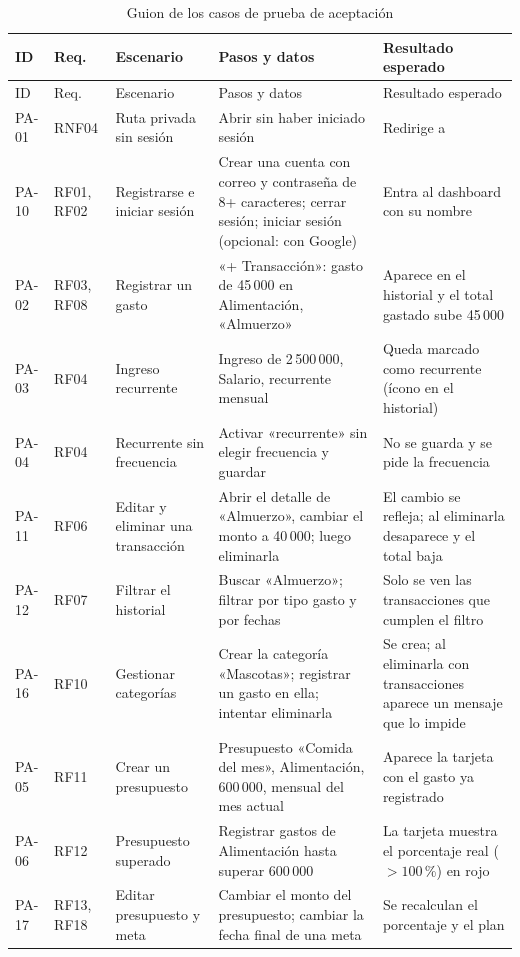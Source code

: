 {\footnotesize\renewcommand{\arraystretch}{1.15}
\begin{longtable}{L{1.1cm} L{1.3cm} L{3.2cm} L{4.6cm} L{3.2cm}}
\caption{Guion de los casos de prueba de aceptación}\label{tab:pa}\\
\toprule
ID & Req. & Escenario & Pasos y datos & Resultado esperado \\
\midrule
\endfirsthead
\toprule
ID & Req. & Escenario & Pasos y datos & Resultado esperado \\
\midrule
\endhead
\bottomrule
\endfoot
PA-01 & RNF04 & Ruta privada sin sesión & Abrir  sin haber iniciado sesión & Redirige a  \\
PA-10 & RF01, RF02 & Registrarse e iniciar sesión & Crear una cuenta con correo y contraseña de 8+ caracteres; cerrar sesión; iniciar sesión (opcional: con Google) & Entra al dashboard con su nombre \\
PA-02 & RF03, RF08 & Registrar un gasto & «+ Transacción»: gasto de 45\,000 en Alimentación, «Almuerzo» & Aparece en el historial y el total gastado sube 45\,000 \\
PA-03 & RF04 & Ingreso recurrente & Ingreso de 2\,500\,000, Salario, recurrente mensual & Queda marcado como recurrente (ícono en el historial) \\
PA-04 & RF04 & Recurrente sin frecuencia & Activar «recurrente» sin elegir frecuencia y guardar & No se guarda y se pide la frecuencia \\
PA-11 & RF06 & Editar y eliminar una transacción & Abrir el detalle de «Almuerzo», cambiar el monto a 40\,000; luego eliminarla & El cambio se refleja; al eliminarla desaparece y el total baja \\
PA-12 & RF07 & Filtrar el historial & Buscar «Almuerzo»; filtrar por tipo gasto y por fechas & Solo se ven las transacciones que cumplen el filtro \\
PA-16 & RF10 & Gestionar categorías & Crear la categoría «Mascotas»; registrar un gasto en ella; intentar eliminarla & Se crea; al eliminarla con transacciones aparece un mensaje que lo impide \\
PA-05 & RF11 & Crear un presupuesto & Presupuesto «Comida del mes», Alimentación, 600\,000, mensual del mes actual & Aparece la tarjeta con el gasto ya registrado \\
PA-06 & RF12 & Presupuesto superado & Registrar gastos de Alimentación hasta superar 600\,000 & La tarjeta muestra el porcentaje real ($> 100$\,\%) en rojo \\
PA-17 & RF13, RF18 & Editar presupuesto y meta & Cambiar el monto del presupuesto; cambiar la fecha final de una meta & Se recalculan el porcentaje y el plan \\

\end{longtable}}

